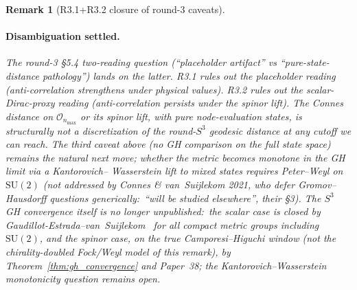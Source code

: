 \documentclass[11pt]{article}
\newtheorem{remark}{Remark}
\begin{document}
\begin{remark}[R3.1+R3.2 closure of round-3 caveats]
\paragraph{Disambiguation settled.}  The round-3 \S 5.4
two-reading question (``placeholder artifact'' vs
``pure-state-distance pathology'') lands on the latter.  R3.1
rules out the placeholder reading (anti-correlation
\emph{strengthens} under physical values).  R3.2 rules out the
scalar-Dirac-proxy reading (anti-correlation persists under the
spinor lift).  The Connes distance on $\mathcal{O}_{n_{\max}}$ or
its spinor lift, with pure node-evaluation states, is structurally
not a discretization of the round-$S^3$ geodesic distance at any
cutoff we can reach.  The third caveat above (no GH comparison
on the full state space) remains the natural next move; whether
the metric becomes monotone in the GH limit via a Kantorovich--
Wasserstein lift to mixed states requires Peter--Weyl on
$\mathrm{SU}(2)$ (not addressed by Connes \& van~Suijlekom 2021, who
defer Gromov--Hausdorff questions generically:\ ``will be studied
elsewhere'', their \S 3).  The $S^3$ GH
convergence itself is no longer unpublished:\ the scalar case is
closed by
Gaudillot-Estrada--van~Suijlekom~\cite{gaudillot_estrada_vs2025}
for all compact metric groups including $\mathrm{SU}(2)$, and the
spinor case, on the true Camporesi--Higuchi window (not the
chirality-doubled Fock/Weyl model of this remark), by
Theorem~\ref{thm:gh_convergence} and Paper~38; the
Kantorovich--Wasserstein monotonicity question remains open.
\end{remark}
\end{document}
